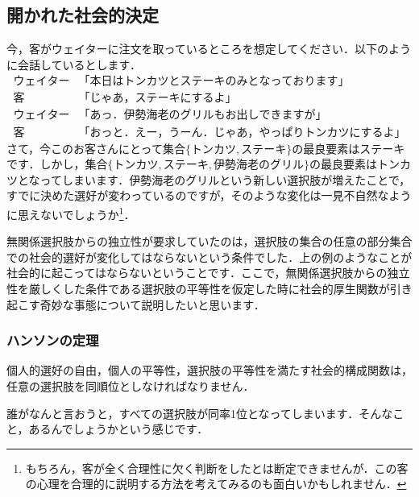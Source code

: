 \subsection{開かれた社会的決定}

今，客がウェイターに注文を取っているところを想定してください．以下のように会話しているとします．
\begin{align*}
    ウェイター & 　「本日はトンカツとステーキのみとなっております」 \\
    客         & 　「じゃあ，ステーキにするよ」 \\
    ウェイター & 　「あっ．伊勢海老のグリルもお出しできますが」 \\
    客         & 　「おっと．えー，うーん．じゃあ，やっぱりトンカツにするよ」 
\end{align*}
さて，今このお客さんにとって集合$\{トンカツ,ステーキ\}$の最良要素はステーキです．しかし，集合$\{トンカツ,ステーキ,伊勢海老のグリル\}$の最良要素はトンカツとなってしまいます．伊勢海老のグリルという新しい選択肢が増えたことで，すでに決めた選好が変わっているのですが，そのような変化は一見不自然なように思えないでしょうか\footnote{もちろん，客が全く合理性に欠く判断をしたとは断定できませんが．この客の心理を合理的に説明する方法を考えてみるのも面白いかもしれません．}．

無関係選択肢からの独立性が要求していたのは，選択肢の集合の任意の部分集合での社会的選好が変化してはならないという条件でした．上の例のようなことが社会的に起こってはならないということです．ここで，無関係選択肢からの独立性を厳しくした条件である選択肢の平等性を仮定した時に社会的厚生関数が引き起こす奇妙な事態について説明したいと思います．

\subsubsection*{ハンソンの定理}
\begin{thm}[ハンソンの定理]
    個人的選好の自由，個人の平等性，選択肢の平等性を満たす社会的構成関数は，任意の選択肢を同順位としなければなりません．
\end{thm}

誰がなんと言おうと，すべての選択肢が同率1位となってしまいます．そんなこと，あるんでしょうかという感じです．

